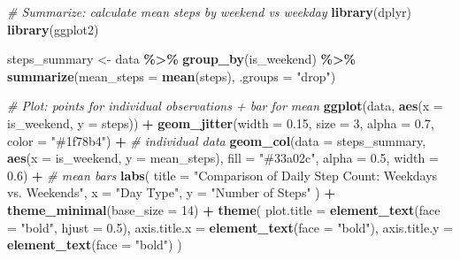 \documentclass[
]{article}
\newenvironment{Shaded}{\begin{snugshade}}{\end{snugshade}}
\newcommand{\AttributeTok}[1]{\textcolor[rgb]{0.13,0.29,0.53}{#1}}
\newcommand{\CommentTok}[1]{\textcolor[rgb]{0.56,0.35,0.01}{\textit{#1}}}
\newcommand{\DecValTok}[1]{\textcolor[rgb]{0.00,0.00,0.81}{#1}}
\newcommand{\FloatTok}[1]{\textcolor[rgb]{0.00,0.00,0.81}{#1}}
\newcommand{\FunctionTok}[1]{\textcolor[rgb]{0.13,0.29,0.53}{\textbf{#1}}}
\newcommand{\NormalTok}[1]{#1}
\newcommand{\OtherTok}[1]{\textcolor[rgb]{0.56,0.35,0.01}{#1}}
\newcommand{\SpecialCharTok}[1]{\textcolor[rgb]{0.81,0.36,0.00}{\textbf{#1}}}
\newcommand{\StringTok}[1]{\textcolor[rgb]{0.31,0.60,0.02}{#1}}
\begin{document}
\begin{Shaded}
\begin{Highlighting}[]
\CommentTok{\# Summarize: calculate mean steps by weekend vs weekday}
\FunctionTok{library}\NormalTok{(dplyr)}
\FunctionTok{library}\NormalTok{(ggplot2)}

\NormalTok{steps\_summary }\OtherTok{\textless{}{-}}\NormalTok{ data }\SpecialCharTok{\%\textgreater{}\%}
  \FunctionTok{group\_by}\NormalTok{(is\_weekend) }\SpecialCharTok{\%\textgreater{}\%}
  \FunctionTok{summarize}\NormalTok{(}\AttributeTok{mean\_steps =} \FunctionTok{mean}\NormalTok{(steps), }\AttributeTok{.groups =} \StringTok{"drop"}\NormalTok{)}

\CommentTok{\# Plot: points for individual observations + bar for mean}
\FunctionTok{ggplot}\NormalTok{(data, }\FunctionTok{aes}\NormalTok{(}\AttributeTok{x =}\NormalTok{ is\_weekend, }\AttributeTok{y =}\NormalTok{ steps)) }\SpecialCharTok{+}
  \FunctionTok{geom\_jitter}\NormalTok{(}\AttributeTok{width =} \FloatTok{0.15}\NormalTok{, }\AttributeTok{size =} \DecValTok{3}\NormalTok{, }\AttributeTok{alpha =} \FloatTok{0.7}\NormalTok{, }\AttributeTok{color =} \StringTok{"\#1f78b4"}\NormalTok{) }\SpecialCharTok{+}  \CommentTok{\# individual data}
  \FunctionTok{geom\_col}\NormalTok{(}\AttributeTok{data =}\NormalTok{ steps\_summary, }\FunctionTok{aes}\NormalTok{(}\AttributeTok{x =}\NormalTok{ is\_weekend, }\AttributeTok{y =}\NormalTok{ mean\_steps), }
           \AttributeTok{fill =} \StringTok{"\#33a02c"}\NormalTok{, }\AttributeTok{alpha =} \FloatTok{0.5}\NormalTok{, }\AttributeTok{width =} \FloatTok{0.6}\NormalTok{) }\SpecialCharTok{+}  \CommentTok{\# mean bars}
  \FunctionTok{labs}\NormalTok{(}
    \AttributeTok{title =} \StringTok{"Comparison of Daily Step Count: Weekdays vs. Weekends"}\NormalTok{,}
    \AttributeTok{x =} \StringTok{"Day Type"}\NormalTok{,}
    \AttributeTok{y =} \StringTok{"Number of Steps"}
\NormalTok{  ) }\SpecialCharTok{+}
  \FunctionTok{theme\_minimal}\NormalTok{(}\AttributeTok{base\_size =} \DecValTok{14}\NormalTok{) }\SpecialCharTok{+}
  \FunctionTok{theme}\NormalTok{(}
    \AttributeTok{plot.title =} \FunctionTok{element\_text}\NormalTok{(}\AttributeTok{face =} \StringTok{"bold"}\NormalTok{, }\AttributeTok{hjust =} \FloatTok{0.5}\NormalTok{),}
    \AttributeTok{axis.title.x =} \FunctionTok{element\_text}\NormalTok{(}\AttributeTok{face =} \StringTok{"bold"}\NormalTok{),}
    \AttributeTok{axis.title.y =} \FunctionTok{element\_text}\NormalTok{(}\AttributeTok{face =} \StringTok{"bold"}\NormalTok{)}
\NormalTok{  )}
\end{Highlighting}
\end{Shaded}
\end{document}
